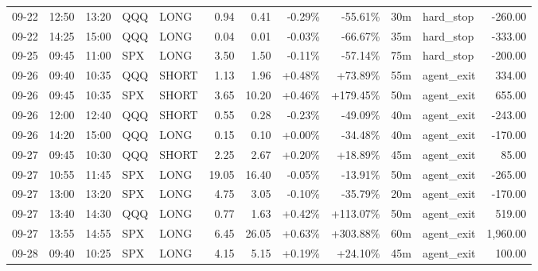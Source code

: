 \documentclass[11pt,a4paper,twoside]{article}
\begin{document}
\begin{center}
\begin{longtable}{>{\color{txtmain}}l l l l l r r r r r >{\color{txtmain}}l r}
09-22 & 12:50 & 13:20 & QQQ & LONG & 0.94 & 0.41 & \textcolor{lossred}{-0.29\%} & \textcolor{lossred}{-55.61\%} & 30m & hard\_stop & \textcolor{lossred}{-260.00} \\
09-22 & 14:25 & 15:00 & QQQ & LONG & 0.04 & 0.01 & \textcolor{lossred}{-0.03\%} & \textcolor{lossred}{-66.67\%} & 35m & hard\_stop & \textcolor{lossred}{-333.00} \\
09-25 & 09:45 & 11:00 & SPX & LONG & 3.50 & 1.50 & \textcolor{lossred}{-0.11\%} & \textcolor{lossred}{-57.14\%} & 75m & hard\_stop & \textcolor{lossred}{-200.00} \\
09-26 & 09:40 & 10:35 & QQQ & SHORT & 1.13 & 1.96 & \textcolor{wingreen}{+0.48\%} & \textcolor{wingreen}{+73.89\%} & 55m & agent\_exit & \textcolor{wingreen}{334.00} \\
09-26 & 09:45 & 10:35 & SPX & SHORT & 3.65 & 10.20 & \textcolor{wingreen}{+0.46\%} & \textcolor{wingreen}{+179.45\%} & 50m & agent\_exit & \textcolor{wingreen}{655.00} \\
09-26 & 12:00 & 12:40 & QQQ & SHORT & 0.55 & 0.28 & \textcolor{lossred}{-0.23\%} & \textcolor{lossred}{-49.09\%} & 40m & agent\_exit & \textcolor{lossred}{-243.00} \\
09-26 & 14:20 & 15:00 & QQQ & LONG & 0.15 & 0.10 & \textcolor{wingreen}{+0.00\%} & \textcolor{lossred}{-34.48\%} & 40m & agent\_exit & \textcolor{lossred}{-170.00} \\
09-27 & 09:45 & 10:30 & QQQ & SHORT & 2.25 & 2.67 & \textcolor{wingreen}{+0.20\%} & \textcolor{wingreen}{+18.89\%} & 45m & agent\_exit & \textcolor{wingreen}{85.00} \\
09-27 & 10:55 & 11:45 & SPX & LONG & 19.05 & 16.40 & \textcolor{lossred}{-0.05\%} & \textcolor{lossred}{-13.91\%} & 50m & agent\_exit & \textcolor{lossred}{-265.00} \\
09-27 & 13:00 & 13:20 & SPX & LONG & 4.75 & 3.05 & \textcolor{lossred}{-0.10\%} & \textcolor{lossred}{-35.79\%} & 20m & agent\_exit & \textcolor{lossred}{-170.00} \\
09-27 & 13:40 & 14:30 & QQQ & LONG & 0.77 & 1.63 & \textcolor{wingreen}{+0.42\%} & \textcolor{wingreen}{+113.07\%} & 50m & agent\_exit & \textcolor{wingreen}{519.00} \\
09-27 & 13:55 & 14:55 & SPX & LONG & 6.45 & 26.05 & \textcolor{wingreen}{+0.63\%} & \textcolor{wingreen}{+303.88\%} & 60m & agent\_exit & \textcolor{wingreen}{1,960.00} \\
09-28 & 09:40 & 10:25 & SPX & LONG & 4.15 & 5.15 & \textcolor{wingreen}{+0.19\%} & \textcolor{wingreen}{+24.10\%} & 45m & agent\_exit & \textcolor{wingreen}{100.00} \\

\end{longtable}
\end{center}
\end{document}
